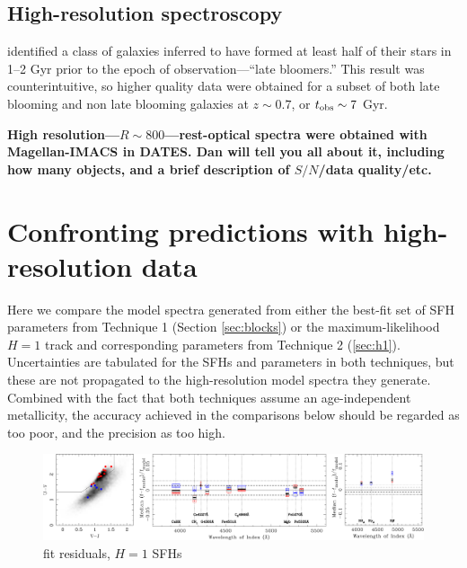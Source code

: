 \documentclass[a4paper,fleqn,usenatbib]{mnras}
\newcommand{\bfr}{\bf\color{red}}
\newcommand{\tobs}{t_{\rm obs}}
\begin{document}
\subsection{High-resolution spectroscopy}
\label{sec: hiRes}

\citet{Dressler16, Dressler18} identified a class of galaxies inferred to have formed at least half of 
their stars in 1--2 Gyr prior to the epoch of observation---``late bloomers.'' This result was counterintuitive, 
so higher quality data were obtained for a subset of both late blooming and non late blooming galaxies
at $z\sim0.7$, or $\tobs\sim7$ Gyr.

{\bfr High resolution---$R\sim800$---rest-optical spectra were obtained with Magellan-IMACS in DATES. 
Dan will tell you all about it, including how many objects, and a brief description of $S/N$/data quality/etc.}


\section{Confronting predictions with high-resolution data}
\label{sec:results}

Here we compare the model spectra generated from either the best-fit set of SFH parameters from 
Technique 1 (Section \ref{sec:blocks}) or the maximum-likelihood $H=1$ track and corresponding 
parameters from Technique 2 (\ref{sec:h1}). Uncertainties are tabulated for the SFHs and parameters 
in both techniques, but these are not propagated to the high-resolution model spectra they generate. 
Combined with the fact that both techniques assume an age-independent metallicity, the accuracy 
achieved in the comparisons below should be regarded as too poor, and the precision as too high.

\begin{figure}
\includegraphics[width = \textwidth]{residuals}
\caption{fit residuals, $H=1$ SFHs}
\label{fig:resids}
\end{figure}
\end{document}
